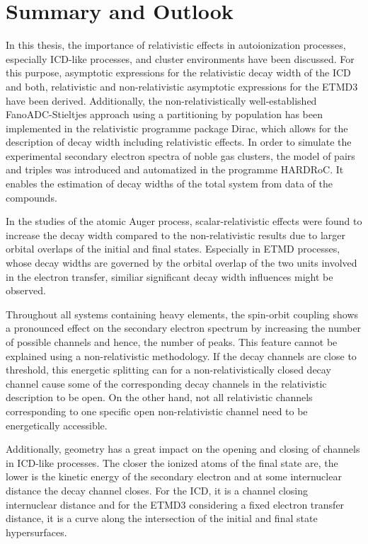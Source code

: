 \chapter{Summary and Outlook}

In this thesis, the importance of relativistic effects in autoionization
processes, especially \ac{ICD}-like
processes, and cluster environments have been discussed.
For this purpose, asymptotic expressions for the relativistic decay width of the ICD
and both, relativistic and non-relativistic asymptotic expressions for the ETMD3
have been derived. Additionally, the non-relativistically well-established
FanoADC-Stieltjes approach
using a partitioning by population has been implemented
in the relativistic programme package Dirac,
which allows for the
description of decay width including relativistic effects.
In order to simulate the experimental secondary electron spectra of noble gas
clusters, the model of pairs and triples was introduced and automatized in the
programme HARDRoC. It enables the estimation of
decay widths of the total system from data of the compounds.

In the studies of the atomic Auger process, scalar-relativistic effects were
found to increase the decay width compared to the non-relativistic results
due to larger orbital overlaps of the initial and final states. Especially
in ETMD processes, whose decay widths are governed by the orbital overlap
of the two units involved in the electron transfer, similiar significant
decay width influences might be observed.

Throughout all systems containing heavy elements, the spin-orbit coupling
shows a pronounced effect on the secondary electron spectrum by increasing the
number of possible channels and hence, the number of peaks. This feature cannot
be explained using a non-relativistic methodology.
If the decay channels are close to threshold, this energetic splitting
can for a non-relativistically closed decay channel cause some of the
corresponding decay channels in the relativistic description to be open. On
the other hand, not all relativistic channels corresponding to one specific
open non-relativistic channel need to be energetically accessible.

Additionally, geometry has a great impact on the opening and closing of channels
in \ac{ICD}-like processes. The closer the ionized atoms of the final state are,
the lower is the kinetic energy of the secondary electron and at some
internuclear distance the decay channel closes. For the ICD, it is a channel
closing internuclear distance and for the ETMD3 considering a fixed electron
transfer distance, it is a curve along the intersection of the initial and final
state hypersurfaces.

